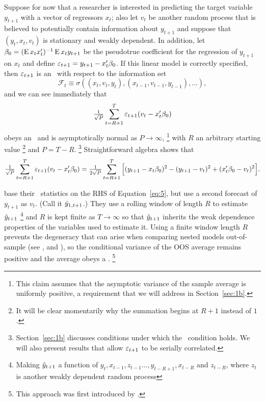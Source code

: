 \documentclass[12pt,fleqn]{article}
\begin{document}
Suppose for now that a researcher is interested in
predicting the target variable $y_{t+1}$ with a vector of regressors
$x_t$; also let $v_t$ be another random process that is believed to
potentially contain information about $y_{t+1}$ and suppose that
$(y_t, x_t, v_t)$ is stationary and weakly dependent.
In addition,
let $\btrue = (\E x_t x_t')^{-1} \E x_t y_{t+1}$ be the pseudotrue
coefficient for the regression of $y_{t+1}$ on $x_t$ and define
$\ep_{t+1} = y_{t+1} - x_t'\btrue$.  If this linear model is
correctly specified, then $\varepsilon_{t+1}$ is an \mds\ with respect
to the information set
\begin{equation*}
\mathcal{F}_t \equiv \sigma((x_t, v_t, y_t), (x_{t-1}, v_{t-1},
y_{t-1}),\dots),
\end{equation*}
and we can see immediately that
\begin{equation}
  \label{eq:4}
  \oclt{t} \ep_{t+1} (v_t - x_t'\btrue)
\end{equation}
obeys an \mds\ \clt and is asymptotically normal as $P \to \infty$,%
\footnote{This claim assumes that the asymptotic variance of the
  sample average is uniformly positive, a requirement that we will
  address in Section~\ref{sec:1b}.} %
with $R$ an arbitrary starting value%
\footnote{It will be clear momentarily why the summation begins at
  $R+1$ instead of $1$.} %
and $P = T - R$.%
\footnote{Section~\ref{sec:1b} discusses conditions under which the
  \mds\ condition holds. We will also present results that allow
  $\varepsilon_{t+1}$ to be serially correlated.} %
Straightforward algebra \citep{ClW:07} shows that
\begin{equation}
  \label{eq:5}
  \tfrac{1}{\sqrt{P}} \osum{t} \ep_{t+1} (v_t -
  x_t'\btrue) = \tfrac{1}{2 \sqrt{P}} \osum{t} \Big[(y_{t+1} -
  x_t\btrue)^2 - (y_{t+1} - v_t)^2 + (x_t'\btrue - v_t)^2 \Big].
\end{equation}

\citet{ClW:06,ClW:07} base their \oos\ statistics on the RHS of
Equation~\eqref{eq:5}, but use a second forecast of $y_{t+1}$ as
$v_t$. (Call it $\hat{y}_{1,t+1}$.) They use a rolling window of length
$R$ to estimate $\hat{y}_{t+1}$%
\footnote{Making $\hat{y}_{t+1}$ a function of $y_t, x_{t-1}, z_{t-1}
\dots, y_{t-R+1}, x_{t-R}$ and $z_{t-R}$, where $z_t$ is another weakly
dependent random process} %
and $R$ is kept finite as $T \to \infty$ so that
$\hat{y}_{t+1}$ inherits the weak dependence properties of the
variables used to estimate it. Using a finite window length $R$ prevents
the degeneracy that can arise when comparing nested models out-of-sample (see
\citealp{ClM:01}, and \citealp{Mcc:07}), so the conditional variance
of the OOS average remains positive and the average obeys a \clt.%
\footnote{This approach was first introduced by \citet{GiW:06}.} %
\end{document}

